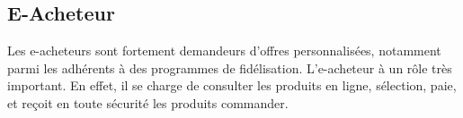 \subsection{E-Acheteur}

Les e-acheteurs sont fortement demandeurs d’offres personnalisées, notamment parmi les adhérents à des programmes de fidélisation.
L'e-acheteur à un rôle très important. En effet, il se charge de consulter les produits en ligne, sélection, paie, et reçoit en toute sécurité les produits commander.